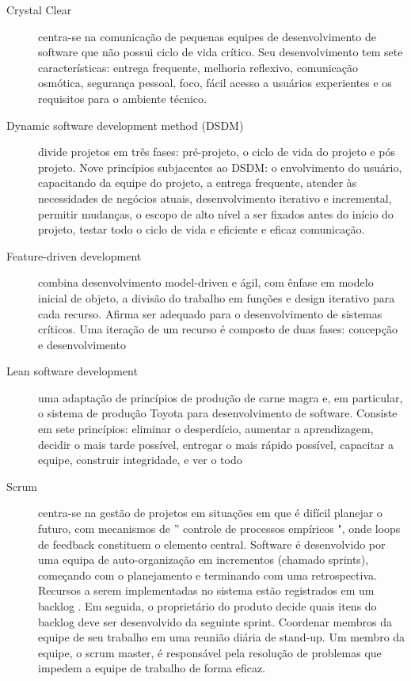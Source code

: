 \begin{description}

\item [Crystal Clear]
%
centra-se na comunicação de pequenas equipes de
desenvolvimento de software que não possui ciclo de vida crítico.
%
Seu desenvolvimento tem sete características: entrega frequente,
melhoria reflexivo, comunicação osmótica, segurança pessoal, foco,
fácil acesso a usuários experientes e os requisitos para o ambiente técnico.

\item [Dynamic software development method (DSDM)]
%
divide projetos em três fases: pré-projeto, o ciclo de vida do projeto  e pós projeto. Nove princípios subjacentes ao DSDM: o envolvimento do usuário, capacitando da equipe do projeto,  a entrega frequente, atender às necessidades de negócios atuais,  desenvolvimento iterativo e incremental, permitir mudanças,  o escopo de alto nível a ser fixados antes do início do projeto,  testar todo o ciclo de vida e eficiente e eficaz comunicação.
            
\item [Feature-driven development]
%
combina desenvolvimento model-driven e ágil, com ênfase  em modelo inicial de objeto, a divisão do trabalho em funções  e design iterativo para cada recurso. Afirma ser adequado para  o desenvolvimento de sistemas críticos. Uma iteração de um  recurso é composto de duas fases: concepção e desenvolvimento
       
\item [Lean software development]
%
uma adaptação de princípios de produção de carne magra e,  em particular, o sistema de produção Toyota para desenvolvimento  de software. Consiste em sete princípios: eliminar o desperdício,  aumentar a aprendizagem, decidir o mais tarde possível,  entregar o mais rápido possível, capacitar a equipe,  construir integridade, e ver o todo
                    
\item [Scrum]
%
centra-se na gestão de projetos em situações em que é difícil  planejar o futuro, com mecanismos de '' controle de processos  empíricos ", onde loops de feedback constituem o elemento central.  Software é desenvolvido por uma equipa de auto-organização  em incrementos (chamado sprints), começando com o planejamento  e terminando com uma retrospectiva. Recursos a serem implementadas  no sistema estão registrados em um backlog . Em seguida,  o proprietário do produto decide quais itens do backlog deve ser  desenvolvido da seguinte sprint. Coordenar membros da equipe  de seu trabalho em uma reunião diária de stand-up. Um membro  da equipe, o scrum master, é responsável pela resolução de  problemas que impedem a equipe de trabalho de forma eficaz.
 

\end{description}
